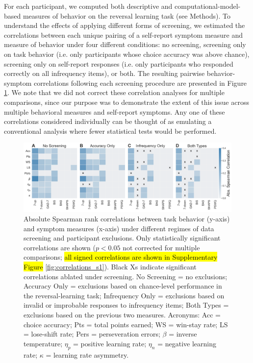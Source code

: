 \documentclass[a4paper,notitlepage,12pt]{article}
\begin{document}
\begin{refsection}[main]
For each participant, we computed both descriptive and computational-model-based measures of behavior on the reversal learning task (see Methods). To understand the effects of applying different forms of screening, we estimated the correlations between each unique pairing of a self-report symptom measure and measure of behavior under four different conditions: no screening, screening only on task behavior (i.e. only participants whose choice accuracy was above chance), screening only on self-report responses (i.e. only participants who responded correctly on all infrequency items), or both. The resulting pairwise behavior-symptom correlations following each screening procedure are presented in Figure \ref{fig:correlations}. We note that we did not correct these correlation analyses for multiple comparisons, since our purpose was to demonstrate the extent of this issue across multiple behavioral measures and self-report symptoms. Any one of these correlations considered individually can be thought of as emulating a conventional analysis where fewer statistical tests would be performed.

\begin{figure}[!t]
\includegraphics[width=17cm]{../figures/main_03a.png}
\centering
\captionsetup{width=0.88\textwidth}
\caption{Absolute Spearman rank correlations between task behavior (y-axis) and symptom measures (x-axis) under different regimes of data screening and participant exclusions. Only statistically significant correlations are shown ($p<0.05$ not corrected for multiple comparisons; \hl{all signed correlations are shown in Supplementary Figure} \ref{fig:correlations_s1}). Black Xs indicate significant correlations ablated under screening. No Screening = no exclusions; Accuracy Only = exclusions based on chance-level performance in the reversal-learning task; Infrequency Only = exclusions based on invalid or improbable responses to infrequency items; Both Types = exclusions based on the previous two measures. Acronyms: Acc = choice accuracy; Pts = total points earned; WS = win-stay rate; LS = lose-shift rate; Pers = perseveration errors; $\beta$ = inverse temperature; $\eta_p$ = positive learning rate; $\eta_n$ = negative learning rate; $\kappa$ = learning rate asymmetry.}
\label{fig:correlations}
\end{figure}


\end{refsection}
\end{document}
